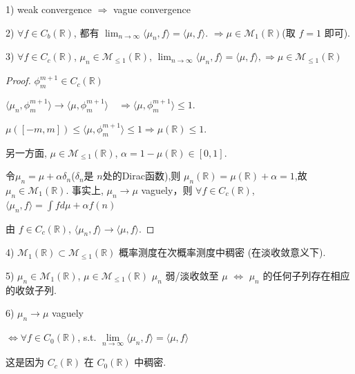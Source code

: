 \begin{remark}
    1) weak convergence $\Rightarrow$ vague convergence
    
2) $\forall f \in C_b(\mathbb{R})$, 都有 $\lim_{n\rightarrow\infty} \langle \mu_n, f \rangle = \langle \mu, f \rangle$.
$\Rightarrow \mu \in \mathcal{M}_1(\mathbb{R})$(取 $f=1$ 即可).

3) $\forall f \in C_c(\mathbb{R})$, $\mu_n \in \mathcal{M}_{\le1}(\mathbb{R})$,
$\lim_{n\rightarrow\infty} \langle \mu_n, f \rangle = \langle \mu, f \rangle, \Rightarrow \mu \in \mathcal{M}_{\le1}(\mathbb{R})$
\begin{proof}
     $\phi_m^{m+1} \in C_c(\mathbb{R})$

$\langle \mu_n, \phi_m^{m+1} \rangle \rightarrow \langle \mu, \phi_m^{m+1} \rangle\quad \Rightarrow\langle \mu, \phi_m^{m+1} \rangle \le 1$.

$\mu([-m,m]) \le \langle \mu, \phi_m^{m+1} \rangle \le 1 \Rightarrow \mu(\mathbb{R}) \le 1$.

另一方面, $\mu \in \mathcal{M}_{\le1}(\mathbb{R})$, $\alpha = 1 - \mu(\mathbb{R}) \in [0,1]$.

令$\mu_n = \mu + \alpha \delta_n$($\delta_n$是 $n$处的Dirac函数),则
$\mu_n(\mathbb{R}) = \mu(\mathbb{R}) + \alpha = 1$,故 $\mu_n \in \mathcal{M}_1(\mathbb{R})$.
事实上, $\mu_n \rightarrow \mu$ vaguely，则
$\forall f \in C_c(\mathbb{R})$, $\langle \mu_n, f \rangle = \int f d\mu + \alpha f(n)$

由 $f \in C_c(\mathbb{R})$, $\langle \mu_n, f \rangle \rightarrow \langle \mu, f \rangle$.

\end{proof}
4) $\mathcal{M}_1(\mathbb{R}) \subset \mathcal{M}_{\le1}(\mathbb{R})$
概率测度在次概率测度中稠密 (在淡收敛意义下).

5) $\mu_n \in \mathcal{M}_1(\mathbb{R})$, $\mu \in \mathcal{M}_{\le1}(\mathbb{R})$
$\mu_n$ 弱/淡收敛至 $\mu$
$\iff$ $\mu_n$ 的任何子列存在相应的收敛子列.

6) $\mu_n \rightarrow \mu$ vaguely

$\iff \forall f \in C_0(\mathbb{R})$, s.t. $\lim\limits_{n\rightarrow\infty} \langle \mu_n, f \rangle = \langle \mu, f \rangle$

这是因为 $C_c(\mathbb{R})$ 在 $C_0(\mathbb{R})$ 中稠密.
\end{remark}

